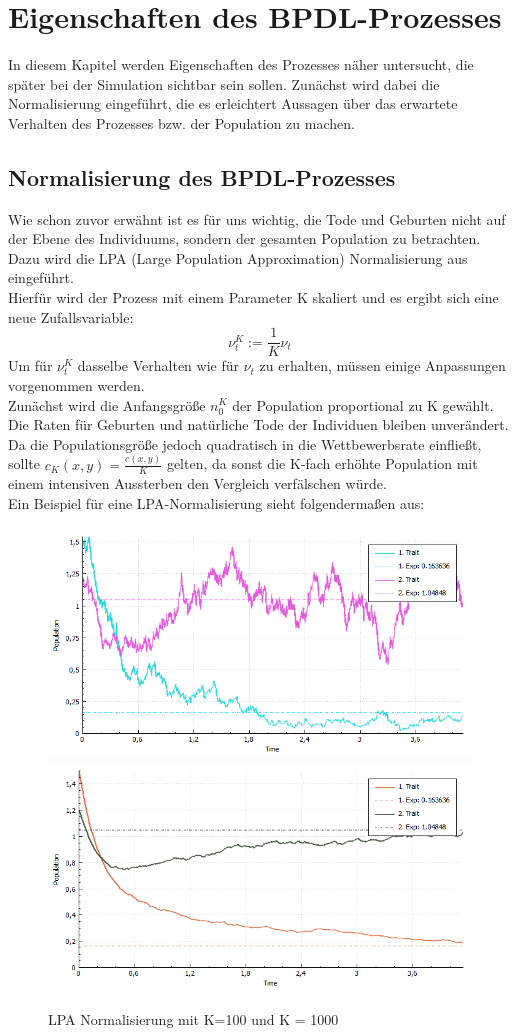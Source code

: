 \documentclass[11pt, a4paper, german]{article}
\theoremstyle{plain}
\begin{document}
\section{Eigenschaften des BPDL-Prozesses}
In diesem Kapitel werden Eigenschaften des Prozesses näher untersucht, die später bei der Simulation sichtbar sein sollen. Zunächst wird dabei die Normalisierung eingeführt, die es erleichtert Aussagen über das erwartete Verhalten des Prozesses bzw. der Population zu machen. 

	\subsection{Normalisierung des BPDL-Prozesses}
	Wie schon zuvor erwähnt ist es für uns wichtig, die Tode und Geburten nicht auf der Ebene des Individuums, sondern der gesamten Population zu betrachten. Dazu wird die LPA (Large Population Approximation) Normalisierung aus \cite{fournier2004microscopic} eingeführt.\\
	Hierfür wird der Prozess mit einem Parameter K skaliert und es ergibt sich eine neue Zufallsvariable:
	\[ \nu_t^K := \frac{1}{K} \nu_t \]
	Um für $ \nu_t^K $ dasselbe Verhalten wie für $ \nu_t $ zu erhalten, müssen einige Anpassungen vorgenommen werden.\\
	Zunächst wird die Anfangsgröße $ n_0^K $ der Population proportional zu K ge\-wählt.
	Die Raten für Geburten und natürliche Tode der Individuen bleiben unverändert. Da die Populationsgröße jedoch quadratisch in die Wettbewerbsrate einfließt, sollte $ c_K(x,y) = \frac{c(x,y)}{K} $ gelten, da sonst die K-fach erhöhte Population mit einem intensiven Aussterben den Vergleich verfälschen würde. \\
	Ein Beispiel für eine LPA-Normalisierung sieht folgendermaßen aus:
	\begin{figure}[H]
		\centering
		\begin{minipage}{1\textwidth}
		\includegraphics[width=0.5\linewidth]{./Pictures/LPANormalisierungK100}
		\includegraphics[width=0.5\linewidth]{./Pictures/LPANormalisierungK10000}
		\end{minipage}
		\caption[LPAK100]{LPA Normalisierung mit K=100 und K = 1000}
		\label{LPA-Normalisierung K=100_1000}
	\end{figure}
\end{document}
